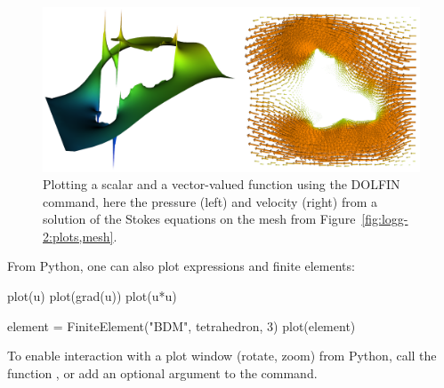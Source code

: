 \begin{figure}
\bwfig
\centering
  \includegraphics[width=\largefig]{chapters/logg-2/png/plots.png}
    \caption{Plotting a scalar and a vector-valued function using the
    DOLFIN  command, here the pressure (left) and velocity
    (right) from a solution of the Stokes equations on the mesh from
    Figure~\ref{fig:logg-2:plots,mesh}.}
  \label{fig:logg-2:plots,function}
\end{figure}

From Python, one can also plot expressions and finite elements:
\begin{python}
plot(u)
plot(grad(u))
plot(u*u)

element = FiniteElement("BDM", tetrahedron, 3)
plot(element)
\end{python}
To enable interaction with a plot window (rotate, zoom) from Python,
call the function , or add an optional argument
 to the  command.

